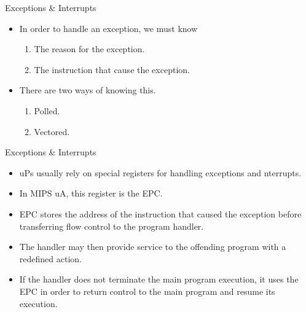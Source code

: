 % 
\begin{frame}{Exceptions \& Interrupts}{}
\begin{itemize}
\item In order to handle an exception, we must know
\begin{enumerate}
\item The reason for the exception.
\item The instruction that cause the exception.
\end{enumerate}
\item There are two ways of knowing this.
  \begin{enumerate}
  \item Polled.
  \item Vectored.
  \end{enumerate}
\end{itemize}
\end{frame} 




% 
\begin{frame}{Exceptions \& Interrupts}{}
\begin{itemize}
\item \acp{uP} usually rely on special registers for handling exceptions and nterrupts.
\item In \ac{MIPS} \ac{uA}, this register is the \ac{EPC}.
\item \ac{EPC} stores the address of the instruction that caused the exception before transferring flow control to the program handler.
\item The handler may then provide service to the offending program with a redefined action.
\item If the handler does not terminate the main program execution, it uses the \ac{EPC} in order to return control to the main program and resume its execution.
\end{itemize}
\end{frame}


